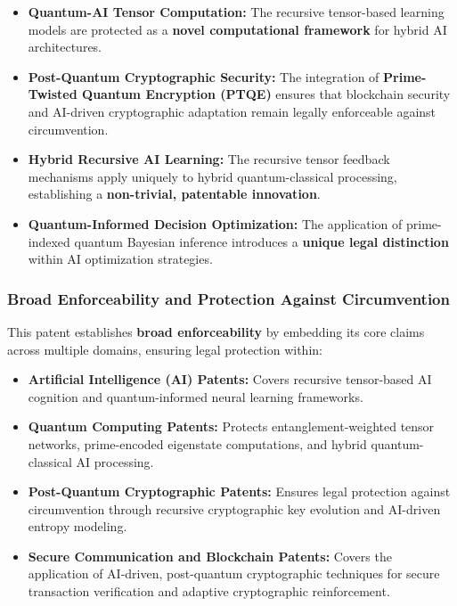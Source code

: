 \documentclass{article}
\theoremstyle{plain}
\begin{document}
\begin{itemize}
    \item \textbf{Quantum-AI Tensor Computation:} The recursive tensor-based learning models are protected as a \textbf{novel computational framework} for hybrid AI architectures.
    \item \textbf{Post-Quantum Cryptographic Security:} The integration of \textbf{Prime-Twisted Quantum Encryption (PTQE)} ensures that blockchain security and AI-driven cryptographic adaptation remain legally enforceable against circumvention.
    \item \textbf{Hybrid Recursive AI Learning:} The recursive tensor feedback mechanisms apply uniquely to hybrid quantum-classical processing, establishing a \textbf{non-trivial, patentable innovation}.
    \item \textbf{Quantum-Informed Decision Optimization:} The application of prime-indexed quantum Bayesian inference introduces a \textbf{unique legal distinction} within AI optimization strategies.
\end{itemize}

\subsubsection{Broad Enforceability and Protection Against Circumvention}

This patent establishes \textbf{broad enforceability} by embedding its core claims across multiple domains, ensuring legal protection within:

\begin{itemize}
    \item \textbf{Artificial Intelligence (AI) Patents:} Covers recursive tensor-based AI cognition and quantum-informed neural learning frameworks.
    \item \textbf{Quantum Computing Patents:} Protects entanglement-weighted tensor networks, prime-encoded eigenstate computations, and hybrid quantum-classical AI processing.
    \item \textbf{Post-Quantum Cryptographic Patents:} Ensures legal protection against circumvention through recursive cryptographic key evolution and AI-driven entropy modeling.
    \item \textbf{Secure Communication and Blockchain Patents:} Covers the application of AI-driven, post-quantum cryptographic techniques for secure transaction verification and adaptive cryptographic reinforcement.
\end{itemize}
\end{document}
